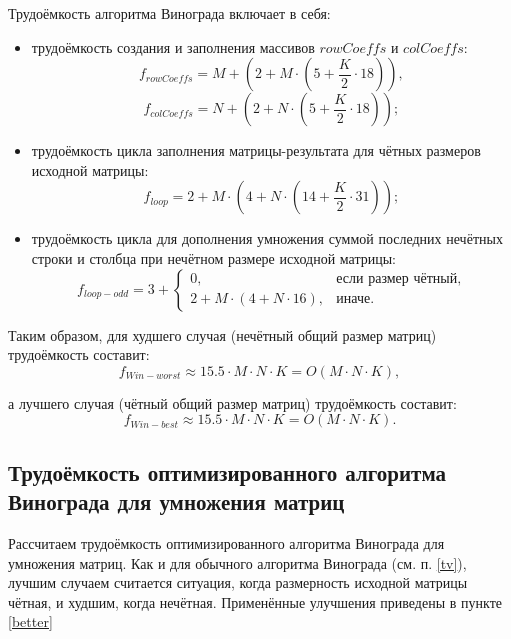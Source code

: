 Трудоёмкость алгоритма Винограда включает в себя:
\begin{itemize}
	\item трудоёмкость создания и заполнения массивов $rowCoeffs$ и $colCoeffs$:
	\begin{equation}
		f_{rowCoeffs} = M + (2 + M \cdot (5 + \frac{K}{2} \cdot 18)),
	\end{equation}
	\begin{equation}
		f_{colCoeffs} = N + (2 + N \cdot (5 + \frac{K}{2} \cdot 18));
	\end{equation}
	\item трудоёмкость цикла заполнения матрицы-результата для чётных размеров исходной матрицы:
	\begin{equation}
		f_{loop} = 2 + M \cdot (4 + N \cdot (14 + \frac{K}{2} \cdot 31));
	\end{equation}
	\item трудоёмкость цикла для дополнения умножения суммой последних нечётных строки и столбца при нечётном размере исходной матрицы:
	\begin{equation}
		f_{loop-odd} = 3 + \begin{cases}
			0, & \text{если размер чётный,}\\
			2 + M \cdot (4 + N \cdot 16), & \text{иначе.}
		\end{cases}
	\end{equation}
\end{itemize}
	
Таким образом, для худшего случая (нечётный общий размер матриц) трудоёмкость составит:
\begin{equation}
	\label{for:bad}
	f_{Win-worst} \approx 15.5 \cdot M \cdot N \cdot K = O(M \cdot N \cdot K),
\end{equation}

а лучшего случая (чётный общий размер матриц) трудоёмкость составит:
\begin{equation}
	\label{for:good}
	f_{Win-best} \approx 15.5 \cdot M \cdot N \cdot K = O(M \cdot N \cdot K).
\end{equation}

\subsection{Трудоёмкость оптимизированного алгоритма Винограда для умножения матриц}
Рассчитаем трудоёмкость оптимизированного алгоритма Винограда для умножения матриц. Как и для обычного алгоритма Винограда (см. п. \ref{tv}), лучшим случаем считается ситуация, когда размерность исходной матрицы чётная, и худшим, когда нечётная. Применённые улучшения приведены в пункте \ref{better}

